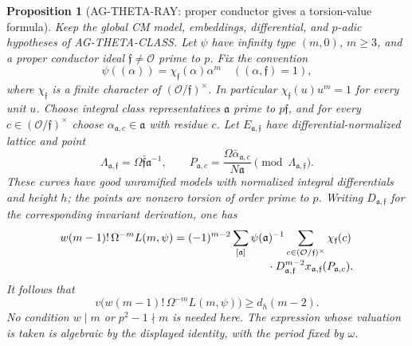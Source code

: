 \documentclass[11pt,a4paper]{article}
\newtheorem{proposition}{Proposition}
\begin{document}
\begin{proposition}[AG-THETA-RAY: proper conductor gives a torsion-value formula]
Keep the global CM model, embeddings, differential, and $p$-adic
hypotheses of AG-THETA-CLASS. Let $\psi$ have infinity type
$(m,0)$, $m\ge3$, and a proper conductor ideal
$\mathfrak f\ne\mathcal O$ prime to $p$. Fix the convention
\[
 \psi((\alpha))=\chi_{\mathfrak f}(\alpha)\alpha^m
 \quad ((\alpha,\mathfrak f)=1),
\]
where $\chi_{\mathfrak f}$ is a finite character of
$(\mathcal O/\mathfrak f)^\times$. In particular
$\chi_{\mathfrak f}(u)u^m=1$ for every unit $u$.
Choose integral class representatives $\mathfrak a$ prime to
$p\mathfrak f$, and for every
$c\in(\mathcal O/\mathfrak f)^\times$ choose
$\alpha_{\mathfrak a,c}\in\mathfrak a$ with residue $c$.
Let $E_{\mathfrak a,\mathfrak f}$ have differential-normalized
lattice and point
\[
 \Lambda_{\mathfrak a,\mathfrak f}
    =\Omega\bar{\mathfrak f}\mathfrak a^{-1},\qquad
 P_{\mathfrak a,c}
    =\frac{\Omega\bar\alpha_{\mathfrak a,c}}{N\mathfrak a}
          \pmod{\Lambda_{\mathfrak a,\mathfrak f}}.
\]
These curves have good unramified models with normalized integral
differentials and height $h$; the points are nonzero torsion of
order prime to $p$. Writing $D_{\mathfrak a,\mathfrak f}$ for
the corresponding invariant derivation, one has
\begin{equation}\label{eq:ag-cm-ray-sum}
 \begin{aligned}
 w(m-1)!\,\Omega^{-m}L(m,\psi)
   ={}&(-1)^{m-2}\sum_{[\mathfrak a]}
         \psi(\mathfrak a)^{-1}
       \sum_{c\in(\mathcal O/\mathfrak f)^\times}
          \chi_{\mathfrak f}(c)\\[-2pt]
     &\hspace{25mm}\cdot
       D_{\mathfrak a,\mathfrak f}^{m-2}
          x_{\mathfrak a,\mathfrak f}(P_{\mathfrak a,c}).
 \end{aligned}
\end{equation}
It follows that
\[
 v\bigl(w(m-1)!\,\Omega^{-m}L(m,\psi)\bigr)
       \ge d_h(m-2).
\]
No condition $w\mid m$ or $p^2-1\nmid m$ is needed here.
The expression whose valuation is taken is algebraic by the
displayed identity, with the period fixed by $\omega$.
\end{proposition}
\end{document}
